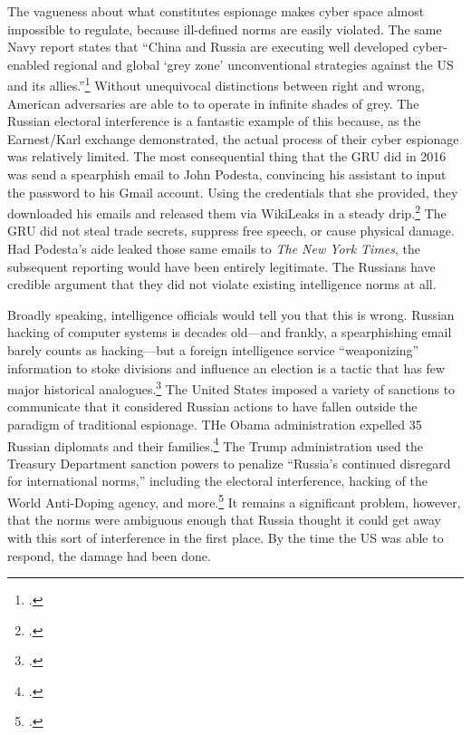 \documentclass{memoir}
\begin{document}
\begin{refsegment}
The vagueness about what constitutes espionage makes cyber space almost impossible to regulate, because ill-defined norms are easily violated. The same Navy report states that ``China and Russia are executing well developed cyber-enabled regional and global `grey zone' unconventional strategies against the US and its allies.''\footcite[p.~4]{bayer_cybersecurity_2019} Without unequivocal distinctions between right and wrong, American adversaries are able to to operate in infinite shades of grey. The Russian electoral interference is a fantastic example of this because, as the Earnest/Karl exchange demonstrated, the actual process of their cyber espionage was relatively limited. The most consequential thing that the GRU did in 2016 was send a spearphish email to John Podesta, convincing his assistant to input the password to his Gmail account. Using the credentials that she provided, they downloaded his emails and released them via WikiLeaks in a steady drip.\footcite{nakashima_how_2018} The GRU did not steal trade secrets, suppress free speech, or cause physical damage. Had Podesta's aide leaked those same emails to \emph{The New York Times}, the subsequent reporting would have been entirely legitimate. The Russians have credible argument that they did not violate existing intelligence norms at all.

Broadly speaking, intelligence officials would tell you that this is wrong. Russian hacking of computer systems is decades old---and frankly, a spearphishing email barely counts as hacking---but a foreign intelligence service ``weaponizing'' information to stoke divisions and influence an election is a tactic that has few major historical analogues.\footcite{nakashima_how_2018} The United States imposed a variety of sanctions to communicate that it considered Russian actions to have fallen outside the paradigm of traditional espionage. THe Obama administration expelled 35 Russian diplomats and their families.\footcite{mazzetti_game_2016} The Trump administration used the Treasury Department sanction powers to penalize ``Russia’s continued disregard for international norms,'' including the electoral interference, hacking of the World Anti-Doping agency, and more.\footcite{department_of_the_treasury_treasury_2018} It remains a significant problem, however, that the norms were ambiguous enough that Russia thought it could get away with this sort of interference in the first place. By the time the US was able to respond, the damage had been done.


\end{refsegment}
\end{document}
